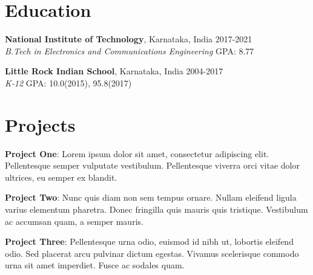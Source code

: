 \documentclass[margin]{res}
\begin{document}


  \address{Address 1 line 1\\Address 1 line 2\\Address 1 line 3}
  \address{Address 2 line 1\\Address 2 line 2\\Address 2 line 3}


  \begin{resume}
    \section{Education}
      \textbf{National Institute of Technology}, Karnataka, India\hfill 
      2017-2021
      \\
      {\sl B.Tech in Electronics and Communications Engineering}\hfill 
      GPA: 8.77
      

      \textbf{Little Rock Indian School}, Karnataka, India\hfill
      2004-2017
      \\
      {\sl K-12}\hfill
      GPA: 10.0(2015), 95.8(2017)

    \section{Projects}
      \par
      \textbf{Project One}: 
      Lorem ipsum dolor sit amet, consectetur adipiscing elit. Pellentesque semper 
      vulputate vestibulum. Pellentesque viverra orci vitae dolor ultrices, eu semper 
      ex blandit. 

      \par
      \textbf{Project Two}:
      Nunc quis diam non sem tempus ornare. Nullam eleifend ligula varius 
      elementum pharetra. Donec fringilla quis mauris quis tristique. Vestibulum ac 
      accumsan quam, a semper mauris. 
      \par
      \textbf{Project Three}: 
      Pellentesque urna odio, euismod id nibh ut,  lobortis eleifend odio. Sed 
      placerat arcu pulvinar dictum egestas. Vivamus  scelerisque commodo urna sit 
      amet imperdiet. Fusce ac sodales quam.


\end{resume}
\end{document}
